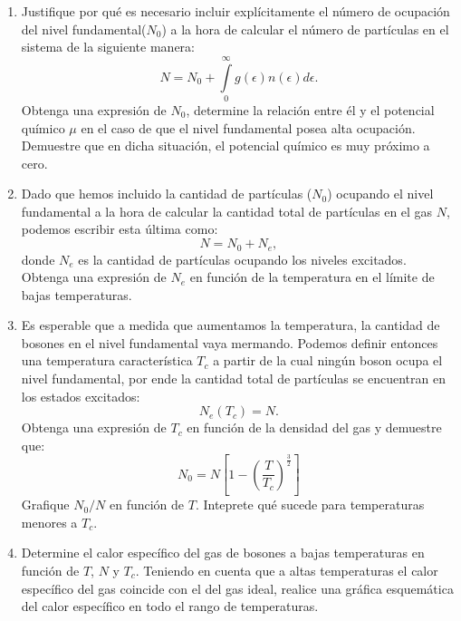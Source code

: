 \documentclass[a4paper,11pt]{article}
\begin{document}
\begin{enumerate}[label=(\alph*),
                  leftmargin=2\parindent,
                  rightmargin=2\parindent]

     \item{Justifique por qué es necesario incluir explícitamente el número 
           de ocupación del nivel fundamental($N_0$) a la hora de calcular el 
           número de partículas en el sistema de la siguiente manera:
           $$ 
           N = 
           N_0 + \int\limits_0^\infty g(\epsilon) n(\epsilon) 
           d\epsilon.
           $$
           Obtenga una expresión de $N_0$, determine la relación entre él y el 
           potencial químico $\mu$ en el caso de que el nivel fundamental 
           posea alta ocupación.
           Demuestre que en dicha situación, el potencial químico es muy 
           próximo a cero.
           }

     \item{Dado que hemos incluido la cantidad de partículas ($N_0$) ocupando 
           el nivel fundamental a la hora de calcular la cantidad total de 
           partículas en el gas $N$, podemos escribir esta última como:
           $$ N = N_0 + N_e, $$
           donde $N_e$ es la cantidad de partículas ocupando los niveles 
           excitados.
           Obtenga una expresión de $N_e$ en función de la temperatura en el 
           límite de bajas temperaturas.}
     
     \item{Es esperable que a medida que aumentamos la temperatura, la 
           cantidad de bosones en el nivel fundamental vaya mermando.
           Podemos definir entonces una temperatura característica $T_c$ a 
           partir de la cual ningún boson ocupa el nivel fundamental, por 
           ende la cantidad total de partículas se encuentran en los estados 
           excitados:
           $$ N_e(T_c) = N. $$
           Obtenga una expresión de $T_c$ en función de la densidad del gas 
           y demuestre que:
           $$ 
           N_0 =
           N \left[ 1 - \left( \frac{T}{T_c} \right)^\frac{3}{2} \right]
           $$
           Grafique $N_0/N$ en función de $T$.
           Inteprete qué sucede para temperaturas menores a $T_c$.
           }

     \item{Determine el calor específico del gas de bosones a bajas 
           temperaturas en función de $T$, $N$ y $T_c$.
           Teniendo en cuenta que a altas temperaturas el calor específico 
           del gas coincide con el del gas ideal, realice una gráfica 
           esquemática del calor específico en todo el rango de temperaturas.
           }

\end{enumerate}
\end{document}
